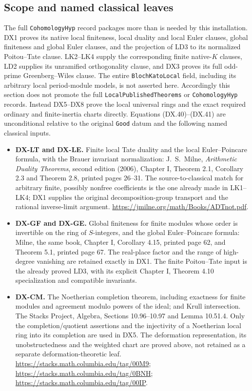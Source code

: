 \subsection{Scope and named classical leaves}

The full \texttt{CohomologyHyp} record packages more than is
needed by this installation.  DX1 proves its native local
finiteness, local duality and local Euler clauses, global
finiteness and global Euler clauses, and the projection of
LD3 to its normalized Poitou--Tate clause.
LK2--LK4 supply the corresponding finite native-$K$ clauses,
LD2 supplies its unramified orthogonality clause, and DX3
proves its full odd-prime Greenberg--Wiles clause.
The entire \texttt{BlochKatoLocal} field, including its
arbitrary local period-module models, is not asserted here.
Accordingly this section does not promote the full
\texttt{LocalPublishedTheorems} or
\texttt{CohomologyHyp} records.
Instead DX5--DX8 prove the local universal rings and
the exact required ordinary and finite-inertia charts
directly.  Equations (DX.40)--(DX.41) are unconditional
relative to the original \texttt{Good} datum and the
following named classical inputs.

\begin{itemize}
\item \textbf{DX-LT and DX-LE.}
Finite local Tate duality and the local Euler--Poincare
formula, with the Brauer invariant normalization:
J.\ S.\ Milne, \emph{Arithmetic Duality Theorems},
second edition (2006), Chapter I, Theorem 2.1,
Corollary 2.3 and Theorem 2.8, printed pages 26--31.
The source-to-classical match for arbitrary finite,
possibly nonfree coefficients is the one already made
in LK1--LK4; DX1 supplies the original decomposition-group
transport and the rational inverse-limit argument.
\url{https://jmilne.org/math/Books/ADTnot.pdf}.
\item \textbf{DX-GF and DX-GE.}
Global finiteness for finite modules whose order is
invertible on the ring of $S$-integers, and the global
Euler--Poincare formula:
Milne, the same book, Chapter I, Corollary 4.15,
printed page 62, and Theorem 5.1, printed page 67.
The real-place factor and the range of high-degree
vanishing are retained exactly in DX1.
The finite Poitou--Tate input is the already proved LD3,
with its explicit Chapter I, Theorem 4.10 specialization
and compatible invariants.
\item \textbf{DX-CM.}
The Noetherian completion theorem, including exactness
for finite modules and agreement modulo powers of the
ideal; and Krull intersection.
The Stacks Project, Algebra, Sections 10.96--10.97
and Lemma 10.51.4.
Only the completion/quotient assertions and the injectivity
of a Noetherian local ring into its completion are used
in DX5.  The deformation representation, its
unobstructedness and the weighted chart are proved above,
not retained as a separate deformation-theoretic leaf.
\url{https://stacks.math.columbia.edu/tag/00M9};
\url{https://stacks.math.columbia.edu/tag/0BNH};
\url{https://stacks.math.columbia.edu/tag/00IP}.
\end{itemize}

